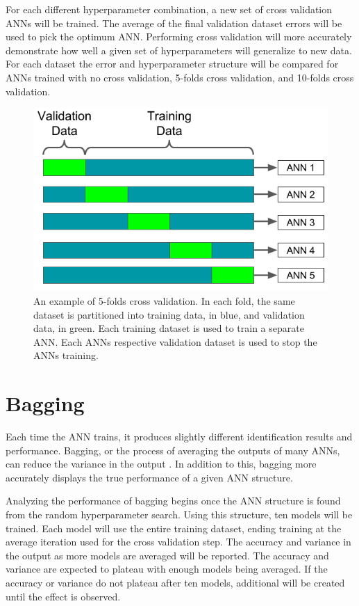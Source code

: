 \documentclass[tocnosub,noragright,centerchapter,12pt,fullpage]{uiucecethesis09}
\begin{document}
For each different hyperparameter combination, a new set of cross validation ANNs will be trained. The average of the final validation dataset errors will be used to pick the optimum ANN. Performing cross validation will more accurately demonstrate how well a given set of hyperparameters will generalize to new data. For each dataset the error and hyperparameter structure will be compared for ANNs trained with no cross validation, 5-folds cross validation, and 10-folds cross validation.



\begin{figure}[H]
\centering
\includegraphics[width=0.6\linewidth]{images/kfolds_example}
\caption{An example of 5-folds cross validation. In each fold, the same dataset is partitioned into training data, in blue, and validation data, in green. Each training dataset is used to train a separate ANN. Each ANNs respective validation dataset is used to stop the ANNs training.}
\label{fig:kfolds_example}
\end{figure}




\section{Bagging} \label{Bagging}
Each time the ANN trains, it produces slightly different identification results and performance. Bagging, or the process of averaging the outputs of many ANNs, can reduce the variance in the output \cite{Breiman1996}. In addition to this, bagging more accurately displays the true performance of a given ANN structure.

Analyzing the performance of bagging begins once the ANN structure is found from the random hyperparameter search. Using this structure, ten models will be trained. Each model will use the entire training dataset, ending training at the average iteration used for the cross validation step. The accuracy and variance in the output as more models are averaged will be reported. The accuracy and variance are expected to plateau with enough models being averaged. If the accuracy or variance do not plateau after ten models, additional will be created until the effect is observed.
\end{document}
